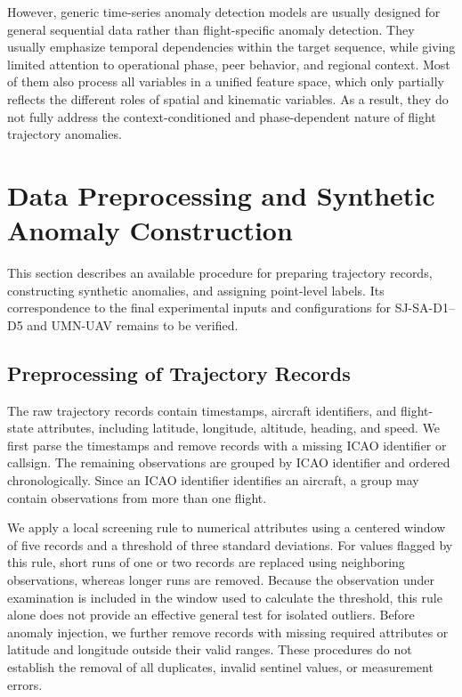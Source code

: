 \documentclass[iicol,pdflatex,sn-basic,Numbered]{sn-jnl}%
\theoremstyle{thmstyleone}%
\theoremstyle{thmstyletwo}%
\theoremstyle{thmstylethree}%
\begin{document}
However, generic time-series anomaly detection models are usually designed for general sequential data rather than flight-specific anomaly detection.
They usually emphasize temporal dependencies within the target sequence, while giving limited attention to operational phase, peer behavior, and regional context.
Most of them also process all variables in a unified feature space, which only partially reflects the different roles of spatial and kinematic variables.
As a result, they do not fully address the context-conditioned and phase-dependent nature of flight trajectory anomalies.

\section{Data Preprocessing and Synthetic Anomaly Construction}
\label{sec:data_preprocessing}

This section describes an available procedure for preparing trajectory records, constructing synthetic anomalies, and assigning point-level labels. Its correspondence to the final experimental inputs and configurations for SJ-SA-D1--D5 and UMN-UAV remains to be verified.

\subsection{Preprocessing of Trajectory Records}

The raw trajectory records contain timestamps, aircraft identifiers, and flight-state attributes, including latitude, longitude, altitude, heading, and speed. 
We first parse the timestamps and remove records with a missing ICAO identifier or callsign. 
The remaining observations are grouped by ICAO identifier and ordered chronologically. 
Since an ICAO identifier identifies an aircraft, a group may contain observations from more than one flight.

We apply a local screening rule to numerical attributes using a centered window of five records and a threshold of three standard deviations. 
For values flagged by this rule, short runs of one or two records are replaced using neighboring observations, whereas longer runs are removed. 
Because the observation under examination is included in the window used to calculate the threshold, this rule alone does not provide an effective general test for isolated outliers. 
Before anomaly injection, we further remove records with missing required attributes or latitude and longitude outside their valid ranges. 
These procedures do not establish the removal of all duplicates, invalid sentinel values, or measurement errors.
\end{document}
